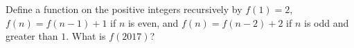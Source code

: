 Define a function on the positive integers recursively by $f(1)=2$, $f(n)=f(n-1)+1$ if $n$ is even, and $f(n)=f(n-2)+2$ if $n$ is odd and greater than $1$. What is $f(2017)$?
